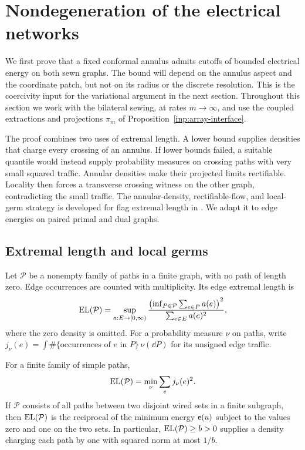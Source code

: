 \section{Nondegeneration of the electrical networks}
\label{sec:nondegeneration}

We first prove that a fixed conformal annulus admits cutoffs of bounded
electrical energy on both sewn graphs.  The bound will depend on the
annulus aspect and the coordinate patch, but not on its radius or the
discrete resolution.  This is the coercivity input for the variational
argument in the next section.  Throughout this section we work with
the bilateral sewing, at rates $m\to\infty$, and use the coupled
extractions and projections $\pi_m$ of
Proposition~\ref{inp:array-interface}.

The proof combines two uses of extremal length.  A lower bound supplies
densities that charge every crossing of an annulus.  If lower bounds
failed, a suitable quantile would instead supply probability measures
on crossing paths with very small squared traffic.  Annular densities
make their projected limits rectifiable.  Locality then forces a
transverse crossing witness on the other graph, contradicting the
small traffic.  The annular-density, rectifiable-flow, and local-germ
strategy is developed for flag extremal length in
\cite[Section ``The canonical conformal structure'']{ConformalMaps}.
We adapt it to edge energies on paired primal and dual graphs.

\subsection{Extremal length and local germs}

Let $\mathcal P$ be a nonempty family of paths in a finite graph, with
no path of length zero.  Edge occurrences are counted with
multiplicity.  Its edge extremal length is
\begin{equation}\label{nd:el-definition}
 \operatorname{EL}(\mathcal P)
 =\sup_{a:E\to[0,\infty)}
   \frac{\bigl(\inf_{P\in\mathcal P}\sum_{e\in P}a(e)\bigr)^2}
        {\sum_{e\in E}a(e)^2},
\end{equation}
where the zero density is omitted.  For a probability measure $\nu$
on paths, write
$j_\nu(e)=\int \#\{\text{occurrences of }e\text{ in }P\}\,\nu(\dd P)$
for its unsigned edge traffic.

\begin{lemma}\label{nd:el-traffic}
For a finite family of simple paths,
\begin{equation}\label{nd:traffic-identity}
 \operatorname{EL}(\mathcal P)=\min_{\nu}\sum_e j_\nu(e)^2.
\end{equation}
If $\mathcal P$ consists of all paths between two disjoint wired sets
in a finite subgraph, then $\operatorname{EL}(\mathcal P)$ is the reciprocal of
the minimum energy $\mathsf e(u)$ subject to the values zero and one on
the two sets.  In particular, $\operatorname{EL}(\mathcal P)\ge b>0$ supplies a
density charging each path by one with squared norm at most $1/b$.
\end{lemma}

